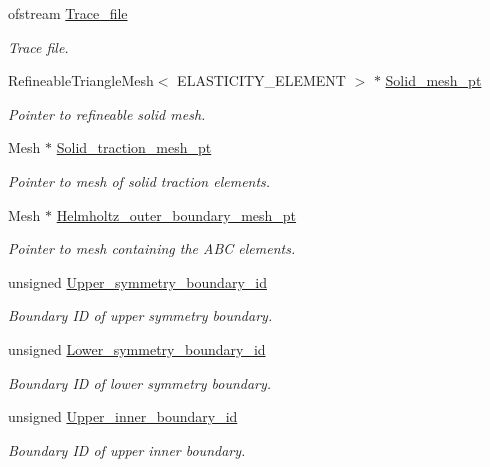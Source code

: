 \begin{DoxyCompactItemize}
ofstream \hyperlink{classCoatedDiskProblem_a5a6336e64a200817fedd99a333d2c0be}{Trace\+\_\+file}
\begin{DoxyCompactList}\small\item\em Trace file. \end{DoxyCompactList}\item 
Refineable\+Triangle\+Mesh$<$ E\+L\+A\+S\+T\+I\+C\+I\+T\+Y\+\_\+\+E\+L\+E\+M\+E\+NT $>$ $\ast$ \hyperlink{classCoatedDiskProblem_a9121e4e334b9570dd19c5b011b726eb7}{Solid\+\_\+mesh\+\_\+pt}
\begin{DoxyCompactList}\small\item\em Pointer to refineable solid mesh. \end{DoxyCompactList}\item 
Mesh $\ast$ \hyperlink{classCoatedDiskProblem_a40be95c16554cc776ee45129c9153cae}{Solid\+\_\+traction\+\_\+mesh\+\_\+pt}
\begin{DoxyCompactList}\small\item\em Pointer to mesh of solid traction elements. \end{DoxyCompactList}\item 
Mesh $\ast$ \hyperlink{classCoatedDiskProblem_a2e3b9aaa75f8ce03625aeaf7a4ea7c77}{Helmholtz\+\_\+outer\+\_\+boundary\+\_\+mesh\+\_\+pt}
\begin{DoxyCompactList}\small\item\em Pointer to mesh containing the A\+BC elements. \end{DoxyCompactList}\item 
unsigned \hyperlink{classCoatedDiskProblem_ab0fb6d4bdf876fb2df1f2fa05606526b}{Upper\+\_\+symmetry\+\_\+boundary\+\_\+id}
\begin{DoxyCompactList}\small\item\em Boundary ID of upper symmetry boundary. \end{DoxyCompactList}\item 
unsigned \hyperlink{classCoatedDiskProblem_a42d2f2b46b0b1a7add92533bd5968033}{Lower\+\_\+symmetry\+\_\+boundary\+\_\+id}
\begin{DoxyCompactList}\small\item\em Boundary ID of lower symmetry boundary. \end{DoxyCompactList}\item 
unsigned \hyperlink{classCoatedDiskProblem_ae22c200ea010aa2420b96c2592034cd5}{Upper\+\_\+inner\+\_\+boundary\+\_\+id}
\begin{DoxyCompactList}\small\item\em Boundary ID of upper inner boundary. \end{DoxyCompactList}\item 

\end{DoxyCompactItemize}
